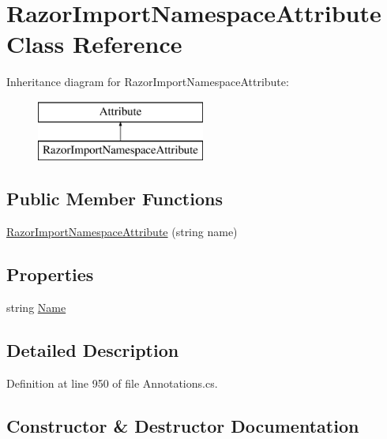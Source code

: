 \hypertarget{class_razor_import_namespace_attribute}{}\section{Razor\+Import\+Namespace\+Attribute Class Reference}
\label{class_razor_import_namespace_attribute}
Inheritance diagram for Razor\+Import\+Namespace\+Attribute\+:\begin{figure}[H]
\begin{center}
\leavevmode
\includegraphics[height=2.000000cm]{class_razor_import_namespace_attribute}
\end{center}
\end{figure}
\subsection*{Public Member Functions}
\begin{DoxyCompactItemize}
\item 
\hyperlink{class_razor_import_namespace_attribute_ab0da268448da74efb48a051a661ecb1e}{Razor\+Import\+Namespace\+Attribute} (string name)
\end{DoxyCompactItemize}
\subsection*{Properties}
\begin{DoxyCompactItemize}
\item 
string \hyperlink{class_razor_import_namespace_attribute_a9416e58cf9013104dd4d22007c417a89}{Name}
\end{DoxyCompactItemize}


\subsection{Detailed Description}


Definition at line 950 of file Annotations.\+cs.



\subsection{Constructor \& Destructor Documentation}
\hypertarget{class_razor_import_namespace_attribute_ab0da268448da74efb48a051a661ecb1e}{}
